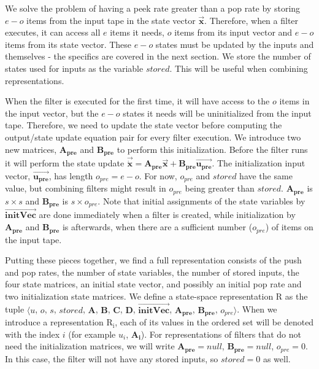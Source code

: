    We solve the problem of having a peek rate greater than a pop
rate by storing $e-o$ items from the input tape in the state
vector $\vec{\mathbf{x}}$. Therefore, when a filter executes, it
can access all $e$ items it needs, $o$ items from its input vector
and $e-o$ items from its state vector. These $e-o$ states must be
updated by the inputs and themselves - the specifics are covered
in the next section. We store the number of states used for inputs
as the variable $stored$. This will be useful when combining
representations.

    When the filter is executed for the first time, it will have access
to the $o$ items in the input vector, but the $e-o$ states it
needs will be uninitialized from the input tape. Therefore, we
need to update the state vector before computing the output/state
update equation pair for every filter execution. We introduce two
new matrices, $\mathbf{A_{pre}}$ and $\mathbf{B_{pre}}$ to perform
this initialization. Before the filter runs it will perform the
state update $\vec{\dot{\mathbf{x}}} =
\mathbf{A_{pre}}\vec{\mathbf{x}} +
\mathbf{B_{pre}}\vec{\mathbf{u_{pre}}}$. The initialization input
vector, $\vec{\mathbf{u_{pre}}}$, has length $o_{pre} = e-o$. For
now, $o_{pre}$ and $stored$ have the same value, but combining
filters might result in $o_{pre}$ being greater than $stored$.
$\mathbf{A_{pre}}$ is $s \times s$ and $\mathbf{B_{pre}}$ is $s
\times o_{pre}$. Note that initial assignments of the state
variables by $\overrightarrow{\mathbf{initVec}}$ are done
immediately when a filter is created, while initialization by
$\mathbf{A_{pre}}$ and $\mathbf{B_{pre}}$ is afterwards, when
there are a sufficient number ($o_{pre}$) of items on the input
tape.

    Putting these pieces together, we find a full representation
consists of the push and pop rates, the number of state variables,
the number of stored inputs, the four state matrices, an initial
state vector, and possibly an initial pop rate and two
initialization state matrices. We define a state-space
representation $\mathrm{R}$ as the tuple $\langle$$u$, $o$, $s$,
$stored$, $\mathbf{A}$, $\mathbf{B}$, $\mathbf{C}$, $\mathbf{D}$,
$\overrightarrow{\mathbf{initVec}}$, $\mathbf{A_{pre}}$,
$\mathbf{B_{pre}}$, $o_{pre}$$\rangle$. When we introduce a
representation $\mathrm{R_i}$, each of its values in the ordered
set will be denoted with the index $i$ (for example $u_i$,
$\mathbf{A_i}$). For representations of filters that do not need
the initialization matrices, we will write $\mathbf{A_{pre}} =
null$, $\mathbf{B_{pre}} = null$, $o_{pre} = 0$. In this case, the
filter will not have any stored inputs, so $stored = 0$ as well.

